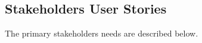 %
%
% 		

\subsection{Stakeholders User Stories}

The primary stakeholders needs are described below.

